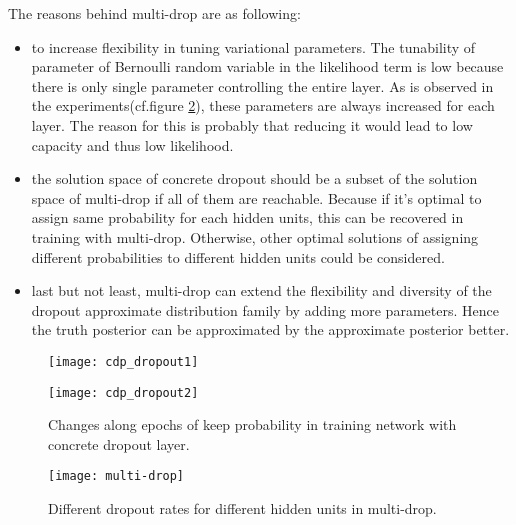 The reasons behind multi-drop are as following:
\begin{itemize}
\item to increase flexibility in tuning variational parameters. The tunability of parameter of Bernoulli random variable in the likelihood term is low because there is only single parameter controlling the entire layer. As is observed in the experiments(cf.figure \ref{fig:cdp_dropout2}), these parameters are always increased for each layer. The reason for this is probably that reducing it would lead to low capacity and thus low likelihood. 

\item the solution space of concrete dropout should be a subset of the solution space of multi-drop if all of them are reachable. Because if it's optimal to assign same probability for each hidden units, this can be recovered in training with multi-drop. Otherwise, other optimal solutions of assigning different probabilities to different hidden units could be considered.

\item last but not least, multi-drop can extend the flexibility and diversity of the dropout approximate distribution family by adding more parameters. Hence the truth posterior can be approximated by the approximate posterior better.
 
\end{itemize}

\begin{figure}[H]
	\begin{center}
		\texttt{[image: cdp\_dropout1]}	
		\label{fig:cdp_dropout1}
	\end{center}
\end{figure}

\begin{figure}[H]
	\begin{center}
		\texttt{[image: cdp\_dropout2]}	
		\label{fig:cdp_dropout2}
		\caption{Changes along epochs of keep probability in training network with concrete dropout layer.}
	\end{center}
\end{figure}

\begin{figure}[H]
	\begin{center}
		\centering
		\texttt{[image: multi-drop]}
		\caption{Different dropout rates for different hidden units in multi-drop.}		
		\label{fig:multi-drop}
	\end{center}
\end{figure}

